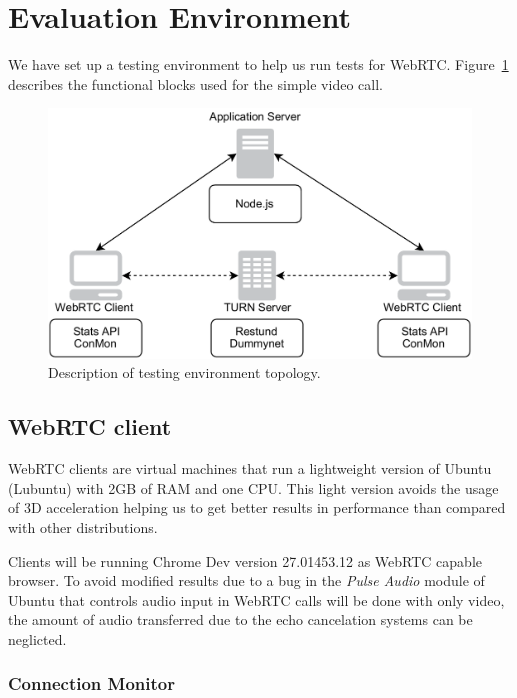 \section{Evaluation Environment}
\label{sec:testingEnv}

\thispagestyle{empty}

We have set up a testing environment to help us run tests for WebRTC. Figure~\ref{fig:evaluation_arch} describes the functional blocks used for the simple video call.

 \begin{figure}[h]
  \centering
    \includegraphics[width=1\textwidth]{./figures/evaluation_arch.pdf}
      \caption[Description of testing environment topology]{Description of testing environment topology.}
	\label{fig:evaluation_arch}
\end{figure}

\subsection{WebRTC client}

WebRTC clients are virtual machines that run a lightweight version of Ubuntu (Lubuntu) with 2GB of RAM and one CPU. This light version avoids the usage of 3D acceleration helping us to get better results in performance than compared with other distributions. 

Clients will be running Chrome Dev version 27.01453.12 as WebRTC capable browser. To avoid modified results due to a bug in the {\it Pulse Audio} module of Ubuntu that controls audio input in WebRTC calls will be done with only video, the amount of audio transferred due to the echo cancelation systems can be neglicted.

\subsubsection{Connection Monitor}


